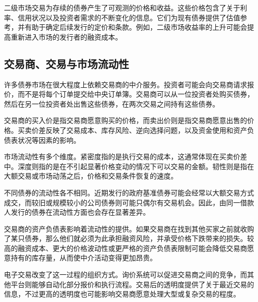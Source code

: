 二级市场交易为存续的债券产生了可观测的价格和收益。这些价格包含了关于利率、信用状况以及投资者需求的不断变化的信息。它们为现有债券提供了估值参考，并有助于确定后续发行的定价和条款。例如，二级市场收益率的上升可能会提高重新进入市场的发行者的融资成本。

\subsection{交易商、交易与市场流动性}

许多债券市场在很大程度上依赖交易商的中介服务。投资者可能会向交易商请求报价，而不是将每个订单提交给中央订单簿。交易商可以从一位投资者处购买债券，然后在另一位投资者处出售这些债券，在两次交易之间持有这些债券。

交易商的买入价是指交易商愿意购买的价格，而卖出价则是指交易商愿意出售的价格。买卖价差反映了交易成本、库存风险、逆向选择问题，以及资金使用和资产负债表状况等因素的影响。

市场流动性有多个维度。紧密度指的是执行交易的成本，这通常体现在买卖价差中。深度则指的是在不引起显著价格变动的情况下可以交易的金额。韧性则是指在大额交易或市场动荡之后，价格和交易条件恢复的速度。

不同债券的流动性各不相同。近期发行的政府基准债券可能会经常以大额交易方式成交，而较旧或规模较小的公司债券则可能只偶尔有交易机会。因此，由同一借款人发行的债券在流动性方面也会存在显著差异。

交易商的资产负债表影响着流动性的提供。如果交易商在找到其他买家之前就收购了某只债券，那么他们就必须为此承担融资风险，并承受价格下跌带来的损失。较高的融资成本、更大的价格波动性或更严格的资产负债表限制可能会降低交易商愿意持有的库存量，从而使中介活动变得更加昂贵。

电子交易改变了这一过程的组织方式。询价系统可以促进交易商之间的竞争，而其他平台则能够自动化部分报价和执行流程。交易后的透明度提供了关于最近交易的信息，不过更高的透明度也可能影响交易商愿意处理大型或复杂交易的程度。

